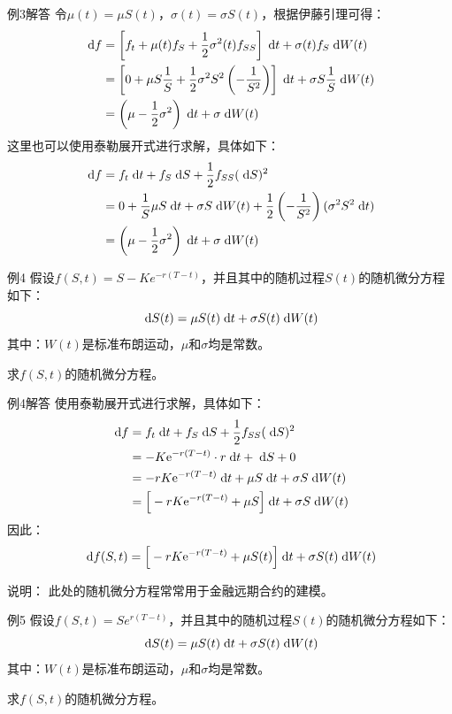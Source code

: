 \documentclass[t]{beamer}
\newcommand{\dif}{{\;\rm d}}
\begin{document}
\begin{frame}{例3解答}\small
    令$\mu(t)=\mu S(t)$，$\sigma(t)=\sigma S(t) $，根据伊藤引理可得：
    \[\begin{split}
    \dif f&=\left[f_t+\mu(t)f_S+\frac{1}{2}\sigma^2(t)f_{SS}\right]\dif t+\sigma(t) f_S \dif W(t)\\
    &=\left[0+\mu S\frac{1}{S}+\frac{1}{2}\sigma^2 S^2\left(-\frac{1}{S^2} \right)  \right]\dif t+ \sigma S\frac{1}{S} \dif W(t)\\
    &=\left(\mu-\frac{1}{2}\sigma^2 \right) \dif t+\sigma \dif W(t)
    \end{split} \]
   这里也可以使用泰勒展开式进行求解，具体如下：
    \[\begin{split}
    \dif f&=f_t\dif t+f_S\dif S+\frac{1}{2}f_{SS}(\dif S)^2\\
    &=0+\frac{1}{S}\mu S\dif t+\sigma S \dif W(t)+\frac{1}{2}\left(-\frac{1}{S^2} \right) (\sigma^2S^2\dif t)\\
    &=\left(\mu-\frac{1}{2}\sigma^2 \right) \dif t+\sigma \dif W(t)
    \end{split} \]
    \end{frame}

\begin{frame}{例4}
假设$f(S,t)=S-Ke^{-r(T-t)}$，并且其中的随机过程$S(t)$的随机微分方程如下：
\[\dif S(t)=\mu S(t)\dif t+\sigma S(t) \dif W(t) \]
其中：$W(t)$是标准布朗运动，$\mu$和$\sigma$均是常数。

求$f(S,t)$的随机微分方程。
\end{frame}

\begin{frame}{例4解答}
    使用泰勒展开式进行求解，具体如下：
\[\begin{split}
\dif f&= f_t \dif t+f_S\dif S+\frac{1}{2}f_{SS}(\dif S)^2\\
&=-K{\rm e}^{-r(T-t)}\cdot r \dif t+\dif S+0\\
&=-rK{\rm e}^{-r(T-t)} \dif t+\mu S\dif t+\sigma S \dif W(t)\\
&=\Big[-rK{\rm e}^{-r(T-t)}+\mu S\Big]\dif t+\sigma S \dif W(t)
\end{split} \]
因此：$$\dif f(S,t)=\Big[-rK{\rm e}^{-r(T-t)}+\mu S(t)\Big]\dif t+\sigma S(t) \dif W(t)$$
\begin{block}{说明：}
    此处的随机微分方程常常用于金融远期合约的建模。
\end{block}

\end{frame}


\begin{frame}{例5}
假设$f(S,t)=Se^{r(T-t)}$，并且其中的随机过程$S(t)$的随机微分方程如下：
\[\dif S(t)=\mu S(t)\dif t+\sigma S(t) \dif W(t) \]
其中：$W(t)$是标准布朗运动，$\mu$和$\sigma$均是常数。

求$f(S,t)$的随机微分方程。
\end{frame}
\end{document}
